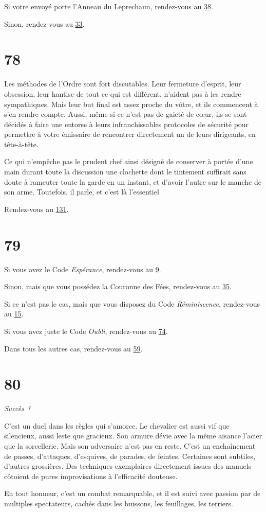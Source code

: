 \documentclass{report}
\newcommand{\gsection}[1]{
    \section{#1}
    \label{section-#1}
}
\newcommand{\glink}[1]{\hyperref[section-#1]{#1}}
\newcommand{\success}{\emph{Succès !}}
\begin{document}
Si votre envoyé porte l'Anneau du Leprechaun, rendez-vous au \glink{38}.

Sinon, rendez-vous au \glink{33}.

\gsection{78}

Les méthodes de l'Ordre sont fort discutables. Leur fermeture d'esprit, leur obsession, leur hantise de tout ce qui est différent, n'aident pas à les rendre sympathiques. Mais leur but final est assez proche du vôtre, et ils commencent à s'en rendre compte. Aussi, même si ce n'est pas de gaieté de cœur, ils se sont décidés à faire une entorse à leurs infranchissables protocoles de sécurité pour permettre à votre émissaire de rencontrer directement un de leurs dirigeants, en tête-à-tête.

Ce qui n'empêche pas le prudent chef ainsi désigné de conserver à portée d'une main durant toute la discussion une clochette dont le tintement suffirait sans doute à rameuter toute la garde en un instant, et d'avoir l'autre sur le manche de son arme. Toutefois, il parle, et c'est là l'essentiel

Rendez-vous au \glink{131}.

\gsection{79}

Si vous avez le Code \emph{Espérance}, rendez-vous au \glink{9}.

Sinon, mais que vous possédez la Couronne des Fées, rendez-vous au \glink{35}.

Si ce n'est pas le cas, mais que vous disposez du Code \emph{Réminiscence}, rendez-vous au \glink{15}.

Si vous avez juste le Code \emph{Oubli}, rendez-vous au \glink{74}.

Dans tous les autres cas, rendez-vous au \glink{59}.

\gsection{80}

\success

C'est un duel dans les règles qui s'amorce. Le chevalier est aussi vif que silencieux, aussi leste que gracieux. Son armure dévie avec la même aisance l'acier que la sorcellerie. Mais son adversaire n'est pas en reste. C'est un enchaînement de passes, d'attaques, d'esquives, de parades, de feintes. Certaines sont subtiles, d'autres grossières. Des techniques exemplaires directement issues des manuels côtoient de pures improvisations à l'efficacité douteuse.

En tout honneur, c'est un combat remarquable, et il est suivi avec passion par de multiples spectateurs, cachés dans les buissons, les feuillages, les terriers.
\end{document}
